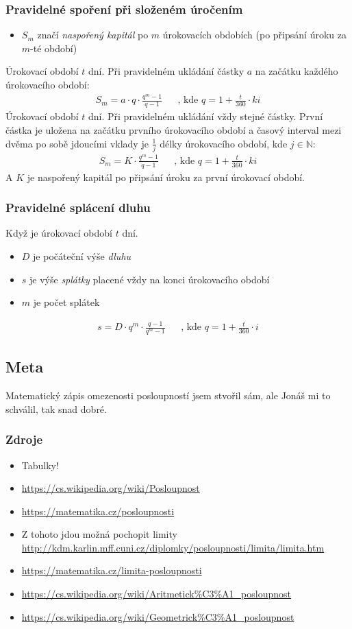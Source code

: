 \documentclass[12pt]{article}
\begin{document}
\subsubsection{Pravidelné spoření při složeném úročením}
\begin{itemize}
\item $S_m$ značí \emph{naspořený kapitál} po $m$ úrokovacích obdobích (po připsání úroku za $m$-té období)
\end{itemize}
Úrokovací období $t$ dní. Při pravidelném ukládání částky $a$ na začátku každého úrokovacího období:
\begin{align}
S_m = a \cdot q \cdot \frac{q^m-1}{q-1} && \text{, kde		} q = 1 + \frac{t}{360} \cdot ki
\end{align}
Úrokovací období $t$ dní. Při pravidelném ukládání vždy stejné částky. První částka je uložena na začátku prvního úrokovacího období a časový interval mezi dvěma po sobě jdoucími vklady je $\frac{1}{j}$ délky úrokovacího období, kde $j \in \mathbb{N}$:
\begin{align}
S_m = K \cdot \frac{q^m - 1}{q-1} && \text{, kde	} q = 1 + \frac{t}{360} \cdot ki
\end{align}
A $K$ je naspořený kapitál po připsání úroku za první úrokovací období.
\subsubsection{Pravidelné splácení dluhu}
Když je úrokovací období $t$ dní.
\begin{itemize}
\item $D$ je počáteční výše \emph{dluhu}
\item $s$ je výše \emph{splátky} placené vždy na konci úrokovacího období
\item $m$ je počet splátek
\end{itemize}
\begin{align}
s = D \cdot q^m \cdot \frac{q-1}{q^m -1} &&  \text{, kde	} q = 1 + \frac{t}{360} \cdot i
\end{align}
\subsection{Meta}
Matematický zápis omezenosti posloupností jsem stvořil sám, ale Jonáš mi to schválil, tak snad dobré.
\subsubsection{Zdroje}
\begin{itemize}
\item Tabulky!
\item \url{https://cs.wikipedia.org/wiki/Posloupnost}
\item  \url{https://matematika.cz/posloupnosti}
\item Z tohoto jdou možná pochopit limity \url{http://kdm.karlin.mff.cuni.cz/diplomky/posloupnosti/limita/limita.htm}
\item \url{https://matematika.cz/limita-posloupnosti}
\item \url{https://cs.wikipedia.org/wiki/Aritmetick\%C3\%A1_posloupnost}
\item \url{https://cs.wikipedia.org/wiki/Geometrick\%C3\%A1_posloupnost}
\end{itemize}
\end{document}
